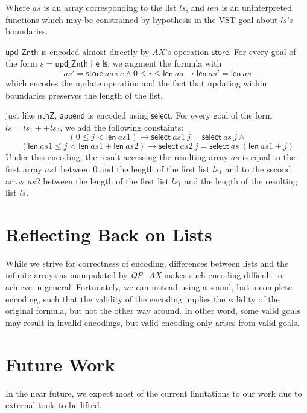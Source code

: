 \documentclass[preprint]{sigplanconf}
\begin{document}
Where $as$ is an array corresponding to the list $ls$, and $len$ is an uninterpreted functions which may be constrained by hypothesis in the VST goal about $ls$'s boundaries.


$\textsf{upd\_Znth}$ is encoded almost directly by $AX$'s operation $\textsf{store}$. For every goal of the form $s = \textsf{upd\_Znth\ i\ e\ ls}$, we augment the formula with
$$ as' = \textsf{store}\ as\ i\ e \wedge 0 \leq i \leq \textsf{len}\ as \to \textsf{len}\ as' = \textsf{len}\ as$$
which encodes the update operation and the fact that updating within boundaries preserves the length of the list.


just like $\textsf{nthZ}$, $\textsf{append}$ is encoded using $\textsf{select}$. For every goal of the form $ls = ls_1 ++ ls_2$, we add the following constaints:
$$(0 \leq j < \textsf{len}\ as1) \to \textsf{select}\ as1\ j = \textsf{select}\ as\ j \wedge $$
$$(\textsf{len}\ as1 \leq j < \textsf{len}\ as1 + \textsf{len}\ as2) \to \textsf{select}\ as2\ j = \textsf{select}\ as\ (\textsf{len}\ as1 + j)$$
Under this encoding, the result accessing the resulting array $as$ is equal to the first array $as1$ between $0$ and the length of the first list $ls_1$ and to the second array $as2$ between the length of the first list $ls_1$ and the length of the resulting list $ls$.



\section{Reflecting Back on Lists}
While we strive for correctness of encoding, differences between lists
and the infinite arrays as manipulated by \emph{QF\_AX} makes such encoding difficult to achieve in general. 
Fortunately, we can instead using a sound, but incomplete encoding, such that the validity 
of the encoding implies the validity of the original formula, but not the other way around.
In other word, some valid goals may result in invalid encodings, but valid encoding only arises from valid goals.






\section{Future Work}
In the near future, we expect most of the current limitations to our work due to external tools to be lifted.
\end{document}
